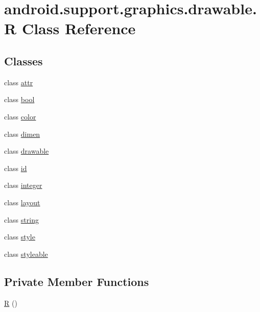\hypertarget{classandroid_1_1support_1_1graphics_1_1drawable_1_1_r}{}\section{android.\+support.\+graphics.\+drawable.\+R Class Reference}
\label{classandroid_1_1support_1_1graphics_1_1drawable_1_1_r}
\subsection*{Classes}
\begin{DoxyCompactItemize}
\item 
class \mbox{\hyperlink{classandroid_1_1support_1_1graphics_1_1drawable_1_1_r_1_1attr}{attr}}
\item 
class \mbox{\hyperlink{classandroid_1_1support_1_1graphics_1_1drawable_1_1_r_1_1bool}{bool}}
\item 
class \mbox{\hyperlink{classandroid_1_1support_1_1graphics_1_1drawable_1_1_r_1_1color}{color}}
\item 
class \mbox{\hyperlink{classandroid_1_1support_1_1graphics_1_1drawable_1_1_r_1_1dimen}{dimen}}
\item 
class \mbox{\hyperlink{classandroid_1_1support_1_1graphics_1_1drawable_1_1_r_1_1drawable}{drawable}}
\item 
class \mbox{\hyperlink{classandroid_1_1support_1_1graphics_1_1drawable_1_1_r_1_1id}{id}}
\item 
class \mbox{\hyperlink{classandroid_1_1support_1_1graphics_1_1drawable_1_1_r_1_1integer}{integer}}
\item 
class \mbox{\hyperlink{classandroid_1_1support_1_1graphics_1_1drawable_1_1_r_1_1layout}{layout}}
\item 
class \mbox{\hyperlink{classandroid_1_1support_1_1graphics_1_1drawable_1_1_r_1_1string}{string}}
\item 
class \mbox{\hyperlink{classandroid_1_1support_1_1graphics_1_1drawable_1_1_r_1_1style}{style}}
\item 
class \mbox{\hyperlink{classandroid_1_1support_1_1graphics_1_1drawable_1_1_r_1_1styleable}{styleable}}
\end{DoxyCompactItemize}
\subsection*{Private Member Functions}
\begin{DoxyCompactItemize}
\item 
\mbox{\hyperlink{classandroid_1_1support_1_1graphics_1_1drawable_1_1_r_a5cc28100d772dee9f3d968e4e284eec3}{R}} ()
\end{DoxyCompactItemize}


